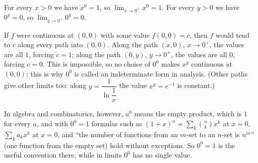 For every $x>0$ we have $x^0=1$, so $\lim_{x\to0^+}x^0=1$. For every $y>0$ we have $0^y=0$, so $\lim_{y\to0^+}0^y=0$.

If $f$ were continuous at $(0,0)$ with some value $f(0,0)=c$, then $f$ would tend to $c$ along every path into $(0,0)$. Along the path $(x,0)$, $x\to0^+$, the values are all $1$, forcing $c=1$; along the path $(0,y)$, $y\to0^+$, the values are all $0$, forcing $c=0$. This is impossible, so no choice of $0^0$ makes $x^y$ continuous at $(0,0)$; this is why $0^0$ is called an indeterminate form in analysis. (Other paths give other limits too: along $y=\dfrac{1}{\ln\dfrac{1}{x}}$ the value $x^y=e^{-1}$ is constant.)

In algebra and combinatorics, however, $a^0$ means the empty product, which is $1$ for every $a$, and with $0^0=1$ formulas such as $(1+x)^n=\sum_k\binom nk x^k$ at $x=0$, $\sum_k a_kx^k$ at $x=0$, and ``the number of functions from an $m$-set to an $n$-set is $n^m$'' (one function from the empty set) hold without exceptions. So $0^0=1$ is the useful convention there, while in limits $0^0$ has no single value.
